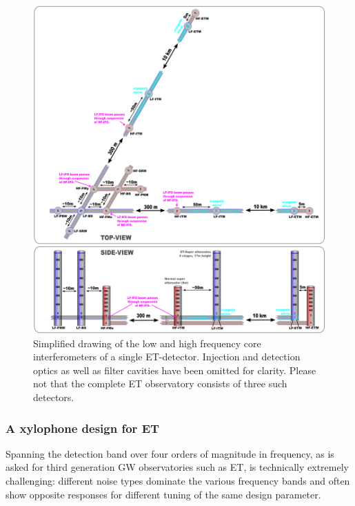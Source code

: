 \begin{figure}[p]
\centering
\includegraphics[width=1\textwidth]{Detector/Optics/Images/ET_April2011_v2.png}
\caption{Simplified drawing of the low and high frequency core interferometers of a single ET-detector. Injection and detection optics as well as filter cavities have been omitted for clarity. Please not that the complete ET observatory consists of three such detectors.%
}
\label{Fig:Simple_ETv1}
\end{figure}

\subsubsection{A xylophone design for ET}\label{sec:xylophone} 
Spanning the detection band over four orders of magnitude in frequency, as is asked for third generation GW observatories such as ET, is technically extremely challenging: different noise types dominate the various frequency bands and often show opposite responses for different tuning of the same design parameter.

